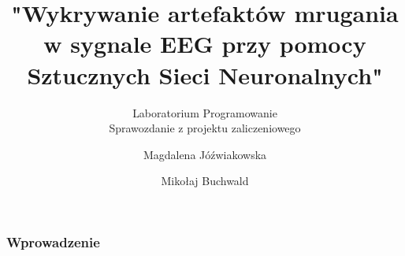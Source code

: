 \documentclass{beamer}
\author[Magdalena Jóźwiakowska, Mikołaj Buchwald]
{
Magdalena Jóźwiakowska
\and
Mikołaj Buchwald
}
\title[EEG ANN]
{"Wykrywanie artefaktów mrugania w sygnale EEG przy pomocy Sztucznych Sieci Neuronalnych"}
\subtitle
{Laboratorium Programowanie\\Sprawozdanie z projektu zaliczeniowego}
\begin{document}

\begin{frame}			%
  \maketitle
\end{frame}


\begin{frame}
    \frametitle{Wprowadzenie}

    \begin{figure}
        \centering
    \end{figure}
    \begin{columns}
        \begin{column}{0.5\textwidth}

\end{column}
\end{columns}
\end{frame}
\end{document}
